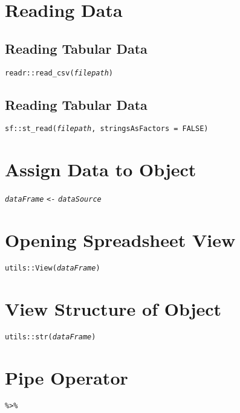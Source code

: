 \documentclass{tufte-handout}
\newenvironment{subs}
  {\adjustwidth{3em}{0pt}}
  {\endadjustwidth}
\begin{document}
\vspace{2mm}
\section{Reading Data}
\begin{subs}
\subsection{Reading Tabular Data}
\texttt{readr::}{\color{red}\texttt{read\_csv}}\texttt{(\textit{filepath})}

\vspace{3mm}
\subsection{Reading Tabular Data}
\texttt{sf::}{\color{red}\texttt{st\_read}}\texttt{(\textit{filepath}, stringsAsFactors = FALSE)}
\end{subs}

\vspace{5mm}
\section{Assign Data to Object}
\texttt{\textit{dataFrame}} {\color{red}\texttt{<-}} \texttt{\textit{dataSource}}

\vspace{5mm}
\section{Opening Spreadsheet View}
\texttt{utils::}{\color{red}\texttt{View}}\texttt{(\textit{dataFrame})}

\vspace{5mm}
\section{View Structure of Object}
\texttt{utils::}{\color{red}\texttt{str}}\texttt{(\textit{dataFrame})}

\vspace{5mm}
\section{Pipe Operator}
\texttt{\%>\%}

\vspace{5mm}
\end{document}
